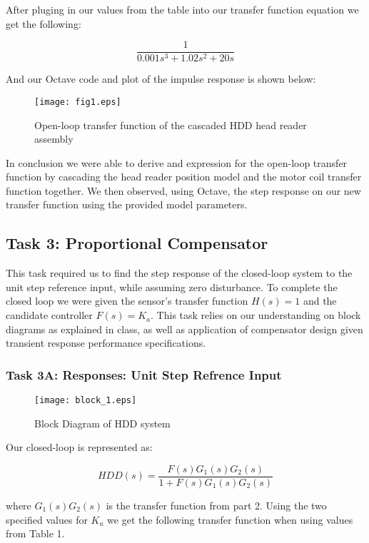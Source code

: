 \documentclass{article}
\newcommand{\matlab}[1]{%
%
}
\begin{document}
After pluging in our values from the table into our transfer function
equation we get the following:

$$\frac{1}{0.001s^3 + 1.02 s^2 + 20s}$$

And our Octave code and plot of the impulse response is shown below:

\matlab{fig1.m}

\begin{figure}[H]
  \caption{Open-loop transfer function of the cascaded HDD head reader
    assembly}
  \centering
  \texttt{[image: fig1.eps]}
\end{figure}

In conclusion we were able to derive and expression for the open-loop
transfer function by cascading the head reader position model and the
motor coil transfer function together. We then observed, using Octave,
the step response on our new transfer function using the provided
model parameters.

\subsection*{Task 3: Proportional Compensator}

This task required us to find the step response of the closed-loop system to
the unit step reference input, while assuming zero disturbance. To complete the
closed loop we were given the sensor's transfer function $H(s) = 1$ and the
candidate controller $F(s) = K_a$. This task relies on our understanding on
block diagrams as explained in class, as well as application of compensator
design given transient response performance specifications.

\subsubsection*{Task 3A: Responses: Unit Step Refrence Input}

\begin{figure}[H]
  \centering
  \caption{Block Diagram of HDD system}
  \texttt{[image: block\_1.eps]}
\end{figure}


Our closed-loop is represented as: 

$$HDD(s) = \frac{F(s)G_1(s)G_2(s)}{1 + F(s)G_1(s)G_2(s)}$$

\noindent
where $G_1(s)G_2(s)$ is the transfer function from part 2. Using the two
specified values for $K_a$ we get the following transfer function when using
values from Table 1.
\end{document}
